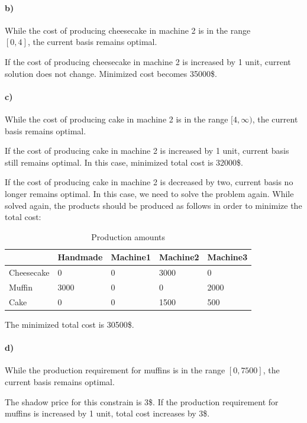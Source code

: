 \documentclass{article}
\begin{document}
\paragraph*{b)}
While the cost of producing cheesecake in machine 2 is in the range\\$[0, 4]$, the current basis remains optimal.

If the cost of producing cheesecake in machine 2 is increased by 1 unit, current solution does not change. Minimized cost becomes 35000\$.

\paragraph*{c)}
While the cost of producing cake in machine 2 is in the range $[4, \infty)$, the current basis remains optimal.

If the cost of producing cake in machine 2 is increased by 1 unit, current basis still remains optimal. In this case, minimized total cost is 32000\$.

If the cost of producing cake in machine 2 is decreased by two, current basis no longer remains optimal. In this case, we need to solve the problem again.
While solved again, the products should be produced as follows in order to minimize the total cost:
\begin{table}[H]
    \centering
    \caption{Production amounts}
    \begin{tabular}{|l|l|l|l|l|}
    \hline
               & Handmade & Machine1 & Machine2 & Machine3 \\ \hline
    Cheesecake & 0        & 0        & 3000     & 0        \\ \hline
    Muffin     & 3000     & 0        & 0        & 2000     \\ \hline
    Cake       & 0        & 0        & 1500     & 500      \\ \hline
    \end{tabular}
    \end{table}
The minimized total cost is 30500\$.

\paragraph*{d)}
While the production requirement for muffins is in the range $[0, 7500]$, the current basis remains optimal.

The shadow price for this constrain is 3\$.
If the production requirement for muffins is increased by 1 unit, total cost increases by 3\$.
\end{document}
